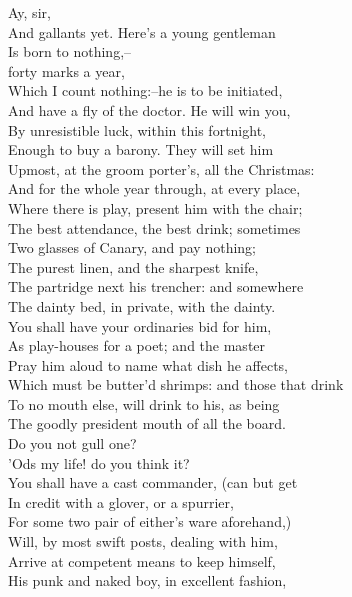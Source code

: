 \documentclass{memoir}
\begin{document}
\begin{drama*}
\facespeaks {} Ay, sir,\\
 And gallants yet. Here's a young gentleman\\
 Is born to nothing,--\\
 forty marks a year,\\
 Which I count nothing:--he is to be initiated,\\
 And have a fly of the doctor. He will win you,\\
 By unresistible luck, within this fortnight,\\
 Enough to buy a barony. They will set him\\
 Upmost, at the groom porter's, all the Christmas:\\
 And for the whole year through, at every place,\\
 Where there is play, present him with the chair;\\
 The best attendance, the best drink; sometimes\\
 Two glasses of Canary, and pay nothing;\\
 The purest linen, and the sharpest knife,\\
 The partridge next his trencher: and somewhere\\
 The dainty bed, in private, with the dainty.\\
 You shall have your ordinaries bid for him,\\
 As play-houses for a poet; and the master\\
 Pray him aloud to name what dish he affects,\\
 Which must be butter'd shrimps: and those that drink\\
 To no mouth else, will drink to his, as being\\
 The goodly president mouth of all the board.\\
\kastrilspeaks  Do you not gull one?\\
\facespeaks {} 'Ods my life! do you think it?\\
 You shall have a cast commander, (can but get\\
 In credit with a glover, or a spurrier,\\
 For some two pair of either's ware aforehand,)\\
Will, by most swift posts, dealing  with him,\\
 Arrive at competent means to keep himself,\\
 His punk and naked boy, in excellent fashion,\\

\end{drama*}
\end{document}

